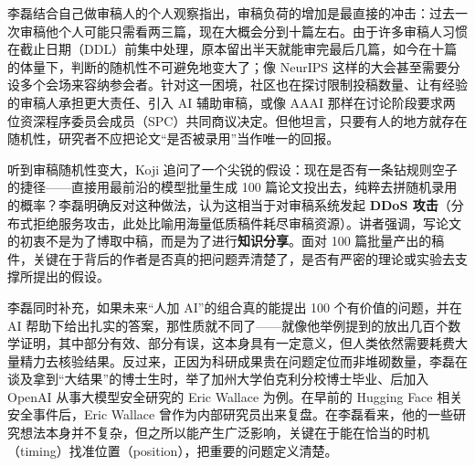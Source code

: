 \documentclass[UTF8,a4paper,11pt,fontset=fandol]{ctexart}
\begin{document}
李磊结合自己做审稿人的个人观察指出，审稿负荷的增加是最直接的冲击：过去一次审稿他个人可能只需看两三篇，现在大概会分到十篇左右。由于许多审稿人习惯在截止日期（DDL）前集中处理，原本留出半天就能审完最后几篇，如今在十篇的体量下，判断的随机性不可避免地变大了；像 NeurIPS 这样的大会甚至需要分设多个会场来容纳参会者。针对这一困境，社区也在探讨限制投稿数量、让有经验的审稿人承担更大责任、引入 AI 辅助审稿，或像 AAAI 那样在讨论阶段要求两位资深程序委员会成员（SPC）共同商议决定。但他坦言，只要有人的地方就存在随机性，研究者不应把论文“是否被录用”当作唯一的回报。

听到审稿随机性变大，Koji 追问了一个尖锐的假设：现在是否有一条钻规则空子的捷径——直接用最前沿的模型批量生成 100 篇论文投出去，纯粹去拼随机录用的概率？李磊明确反对这种做法，认为这相当于对审稿系统发起 \textbf{DDoS 攻击}（分布式拒绝服务攻击，此处比喻用海量低质稿件耗尽审稿资源）。讲者强调，写论文的初衷不是为了博取中稿，而是为了进行\textbf{知识分享}。面对 100 篇批量产出的稿件，关键在于背后的作者是否真的把问题弄清楚了，是否有严密的理论或实验去支撑所提出的假设。

李磊同时补充，如果未来“人加 AI”的组合真的能提出 100 个有价值的问题，并在 AI 帮助下给出扎实的答案，那性质就不同了——就像他举例提到的放出几百个数学证明，其中部分有效、部分有误，这本身具有一定意义，但人类依然需要耗费大量精力去核验结果。反过来，正因为科研成果贵在问题定位而非堆砌数量，李磊在谈及拿到“大结果”的博士生时，举了加州大学伯克利分校博士毕业、后加入 OpenAI 从事大模型安全研究的 Eric Wallace 为例。在早前的 Hugging Face 相关安全事件后，Eric Wallace 曾作为内部研究员出来复盘。在李磊看来，他的一些研究想法本身并不复杂，但之所以能产生广泛影响，关键在于能在恰当的时机（timing）找准位置（position），把重要的问题定义清楚。
\end{document}
